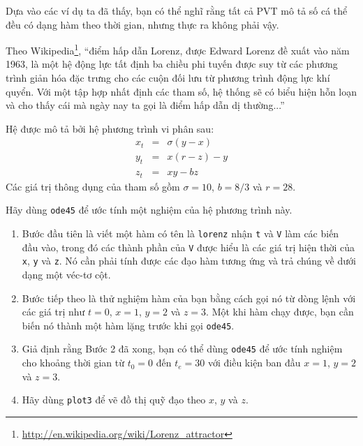 \documentclass[12pt]{book}
\begin{document}
\begin{ex}

Dựa vào các ví dụ ta đã thấy, bạn có thể nghĩ rằng tất cả PVT
mô tả số cá thể đều có dạng hàm theo thời gian, nhưng thực ra
không phải vậy.

Theo Wikipedia\footnote{\url{http://en.wikipedia.org/wiki/Lorenz_attractor}},
``điểm hấp dẫn Lorenz, được Edward Lorenz đề xuất vào năm 1963, là
một hệ động lực tất định ba chiều phi tuyến được suy từ các phương trình
giản hóa đặc trưng cho các cuộn đối lưu từ phương trình động lực khí quyển.
Với một tập hợp nhất định các tham số, hệ thống sẽ có biểu hiện hỗn loạn
và cho thấy cái mà ngày nay ta gọi là điểm hấp dẫn dị thường...''

Hệ được mô tả bởi hệ phương trình vi phân sau:
%
\begin{eqnarray}
x_t &=& \sigma (y - x)  \\
y_t &=& x (r - z) - y   \\
z_t &=& xy - b z
\end{eqnarray}
%
Các giá trị thông dụng của tham số gồm $\sigma = 10$, $b = 8/3$ và $r=28$.

Hãy dùng {\tt ode45} để ước tính một nghiệm của hệ phương trình này.


\begin{enumerate}

\item Bước đầu tiên là viết một hàm có tên là {\tt lorenz} nhận 
{\tt t} và {\tt V} làm các biến đầu vào, trong đó các thành phần 
của {\tt V} được hiểu là các giá trị hiện thời của {\tt x},
{\tt y} và {\tt z}. Nó cần phải tính được các đạo hàm tương ứng
và trả chúng về dưới dạng một véc-tơ cột.

\item Bước tiếp theo là thử nghiệm hàm của bạn bằng cách gọi nó
từ dòng lệnh với các giá trị như 
$t=0$, $x=1$, $y=2$ và $z=3$. Một khi hàm chạy được, bạn cần
biến nó thành một hàm lặng trước khi gọi {\tt ode45}.

\item Giả định rằng Bước 2 đã xong, bạn có thể dùng {\tt ode45}
để ước tính nghiệm cho khoảng thời gian từ $t_0 = 0$ đến $t_e = 30$
với điều kiện ban đầu $x=1$, $y=2$ và $z=3$.

\item Hãy dùng {\tt plot3} để vẽ đồ thị quỹ đạo theo 
$x$, $y$ và $z$.

\end{enumerate}

\end{ex}
\end{document}
